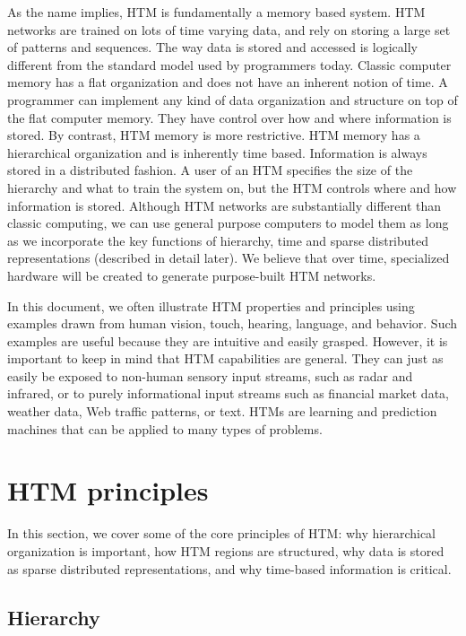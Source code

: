 \documentclass{report}
\begin{document}
As the name implies, HTM is fundamentally a memory based system. HTM
networks are trained on lots of time varying data, and rely on storing
a large set of patterns and sequences. The way data is stored and
accessed is logically different from the standard model used by
programmers today. Classic computer memory has a flat organization and
does not have an inherent notion of time. A programmer can implement
any kind of data organization and structure on top of the flat
computer memory. They have control over how and where information is
stored. By contrast, HTM memory is more restrictive. HTM memory has a
hierarchical organization and is inherently time based. Information is
always stored in a distributed fashion. A user of an HTM specifies the
size of the hierarchy and what to train the system on, but the HTM
controls where and how information is stored. Although HTM networks
are substantially different than classic computing, we can use general
purpose computers to model them as long as we incorporate the key
functions of hierarchy, time and sparse distributed representations
(described in detail later). We believe that over time, specialized
hardware will be created to generate purpose-built HTM networks.

In this document, we often illustrate HTM properties and principles
using examples drawn from human vision, touch, hearing, language, and
behavior. Such examples are useful because they are intuitive and
easily grasped. However, it is important to keep in mind that HTM
capabilities are general. They can just as easily be exposed to
non-human sensory input streams, such as radar and infrared, or to
purely informational input streams such as financial market data,
weather data, Web traffic patterns, or text. HTMs are learning and
prediction machines that can be applied to many types of problems.

\section*{HTM principles}

In this section, we cover some of the core principles of HTM: why
hierarchical organization is important, how HTM regions are
structured, why data is stored as sparse distributed representations,
and why time-based information is critical.

\subsection*{Hierarchy}
\end{document}
